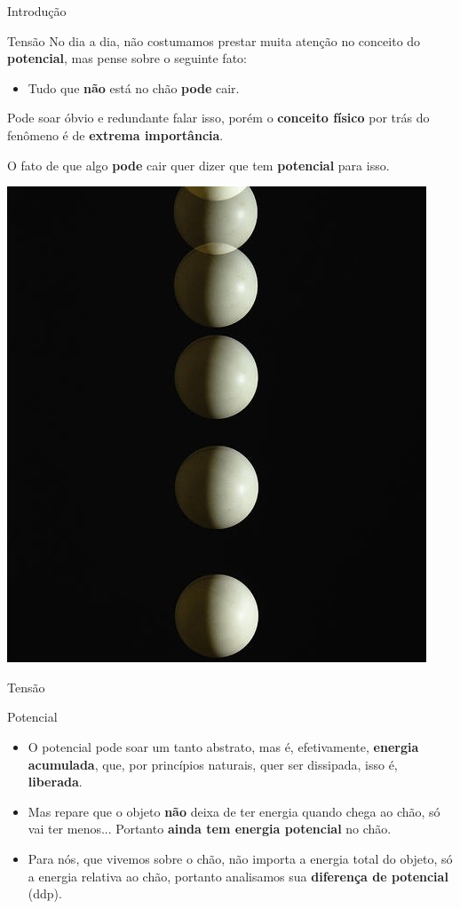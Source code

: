 \begin{frame}{Introdução}
	\begin{block}{Tensão}
		No dia a dia, não costumamos prestar muita atenção no conceito do \textbf{potencial}, mas pense sobre o seguinte fato:
		\begin{itemize}
			\item Tudo que \textbf{não} está no chão \textbf{pode} cair.
		\end{itemize}
		Pode soar óbvio e redundante falar isso, porém o \textbf{conceito físico} por trás do fenômeno é de \textbf{extrema importância}.

		\medskip

		O fato de que algo \textbf{pode} cair quer dizer que tem \textbf{potencial} para isso.
	\end{block}

	\centering
	\includegraphics[height=0.4\textheight]{Figuras/Ch01/fig2}
\end{frame}


\begin{frame}{Tensão}
	\begin{block}{Potencial}
		\begin{itemize}
			\item O potencial pode soar um tanto abstrato, mas é, efetivamente, \textbf{energia acumulada}, que, por princípios naturais, quer ser dissipada, isso é, \textbf{liberada}.
			\item Mas repare que o objeto \textbf{não} deixa de ter energia quando chega ao chão, só vai ter menos... Portanto \textbf{ainda tem energia potencial} no chão.
			\item Para nós, que vivemos sobre o chão, não importa a energia total do objeto, só a energia relativa ao chão, portanto analisamos sua \textbf{diferença de potencial} (ddp).
		\end{itemize}
	\end{block}
\end{frame}


